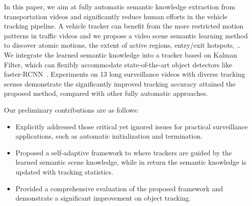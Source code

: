 In this paper, we aim at fully automatic semantic knowledge extraction from transportation videos and
significantly reduce human efforts in the vehicle tracking pipeline.
A vehicle tracker can benefit from the more restricted motion patterns in traffic videos and we propose a video scene semantic learning method to discover atomic motions, the extent of active regions,
entry/exit hotspots, \etc..
We integrate the learned semantic knowledge into a tracker based on Kalman Filter,
which can flexibly accommodate state-of-the-art object detectors like faster-RCNN~\cite{renNIPS15fasterrcnn}.
Experiments on 13 long surveillance videos with diverse tracking scenes demonstrate the significantly improved tracking accuracy attained the proposed method, compared with other fully automatic approaches.


Our preliminary contributions are as follows:
\begin{itemize}%
    \item Explicitly addressed those critical yet ignored issues for practical surveillance applications, such as automatic initialization and termination.
    \item Proposed a self-adaptive framework to where trackers are guided by the learned semantic scene knowledge, while in return the semantic knowledge is updated with tracking statistics.
    \item Provided a comprehensive evaluation of the proposed framework and demonstrate a significant improvement on object tracking.
\end{itemize}


